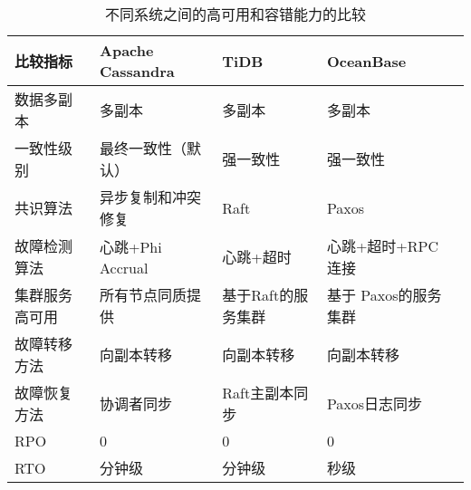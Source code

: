 \begin{table}[h!]
  \centering
  \caption{不同系统之间的高可用和容错能力的比较}
  \label{tab:ha-comparison}
  \begin{tabular}{@{}lllll@{}}
      \toprule
      比较指标 & Apache Cassandra & TiDB & OceanBase\\
      \midrule
      数据多副本 & 多副本 & 多副本 & 多副本  \\
      一致性级别 & 最终一致性（默认） & 强一致性 & 强一致性  \\
      共识算法 & 异步复制和冲突修复 & Raft & Paxos\\
      故障检测算法 & 心跳+Phi Accrual & 心跳+超时 & 心跳+超时+RPC连接 \\
      集群服务高可用 & 所有节点同质提供 & 基于Raft的服务集群 & 基于 Paxos的服务集群 \\
      故障转移方法 &向副本转移& 向副本转移 & 向副本转移\\
      故障恢复方法 &协调者同步 & Raft主副本同步 & Paxos日志同步\\
      RPO & 0 & 0 & 0\\
      RTO & 分钟级& 分钟级 & 秒级\\
      \bottomrule
  \end{tabular}
\end{table}